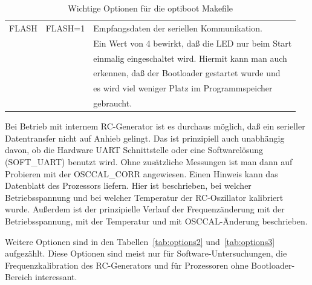 \begin{table}[H]
\begin{center}
\begin{tabular}{| c | c | l |}
      FLASH        &    FLASH=1     & Empfangsdaten der seriellen Kommunikation.\\
	           &                & Ein Wert von 4 bewirkt, daß die LED nur beim Start \\
		   &                & einmalig eingeschaltet wird. Hiermit kann man auch \\
		   &                & erkennen, daß der Bootloader gestartet wurde und \\
		   &                & es wird viel weniger Platz im Programmspeicher \\
		   &                & gebraucht. \\
    \hline
    \end{tabular}
  \end{center}
  \caption{Wichtige Optionen für die optiboot Makefile}
  \label{tab:options1}
\end{table}

Bei Betrieb mit internem RC-Generator ist es durchaus möglich, daß ein serieller Datentransfer
nicht auf Anhieb gelingt. Das ist prinzipiell auch unabhängig davon, ob die Hardware UART
Schnittstelle oder eine Softwarelösung (SOFT\_UART) benutzt wird. Ohne zusätzliche Messungen
ist man dann auf Probieren mit der OSCCAL\_CORR angewiesen. Einen Hinweis kann
das Datenblatt des Prozessors liefern. Hier ist beschrieben, bei welcher Betriebsspannung
und bei welcher Temperatur der RC-Oszillator kalibriert wurde. Außerdem ist der
prinzipielle Verlauf der Frequenzänderung mit der Betriebsspannung, mit der Temperatur und
mit OSCCAL-Änderung beschrieben. 


Weitere Optionen sind in den Tabellen~\ref{tab:options2} und~\ref{tab:options3} aufgezählt. 
Diese Optionen sind meist nur für Software-Untersuchungen, die Frequenzkalibration des RC-Generators
 und für Prozessoren ohne Bootloader-Bereich interessant.

